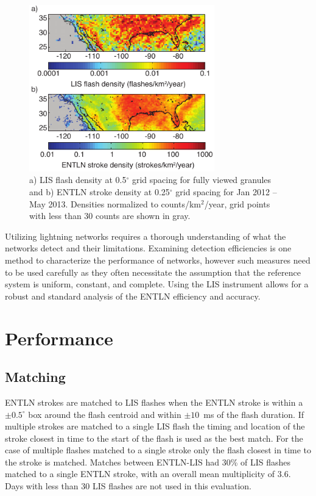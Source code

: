 \begin{figure}[t]
   \centering
   \noindent\includegraphics[width=19pc,angle=0]{entln_lis/Figures/density.pdf}
   \caption{a) LIS flash density at 0.5$^\circ$ grid spacing for fully viewed granules and
   		b) ENTLN stroke density at 0.25$^\circ$ grid spacing for Jan 2012 -- May 2013.
   		Densities normalized to counts/km$^2$/year, grid points with less than 30 counts are shown in gray.}
   \label{density}
\end{figure}

Utilizing lightning networks requires a thorough understanding of what the networks detect and their limitations.
Examining detection efficiencies is one method to characterize the performance of networks, however such measures need to be used carefully as they often necessitate the assumption that the reference system is uniform, constant, and complete.
Using the LIS instrument allows for a robust and standard analysis of the ENTLN efficiency and accuracy.

\section{Performance}

\subsection{Matching}

ENTLN strokes are matched to LIS flashes when the ENTLN stroke is within a $\pm0.5^\circ$ box around the flash centroid and within $\pm10$~ms of the flash duration.
If multiple strokes are matched to a single LIS flash the timing and location of the stroke closest in time to the start of the flash is used as the best match.
For the case of multiple flashes matched to a single stroke only the flash closest in time to the stroke is matched.
Matches between ENTLN-LIS had 30\% of LIS flashes matched to a single ENTLN stroke, with an overall mean multiplicity of 3.6.
Days with less than 30 LIS flashes are not used in this evaluation.


